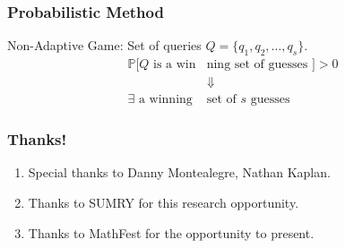 \documentclass{beamer}
\begin{document}
    \begin{frame}
    \frametitle{Probabilistic Method}
    Non-Adaptive Game: Set of queries $Q=\{q_1, q_2, \ldots, q_s\}$.
    	\begin{align*}
		\mathbb{P}[Q\text{ is a win} & \text{ning set of guesses }] > 0 \\
		& \Downarrow \\
		\exists \text{ a winning } & \text{set of $s$ guesses}
		\end{align*}
    \end{frame}

\begin{frame}
\frametitle{Thanks!}
	\begin{enumerate}[label=\arabic*.]
	\item Special thanks to Danny Montealegre, Nathan Kaplan.
	\item Thanks to SUMRY for this research opportunity.
	\item Thanks to MathFest for the opportunity to present.
	\end{enumerate}
\end{frame}

%	
\end{document}
